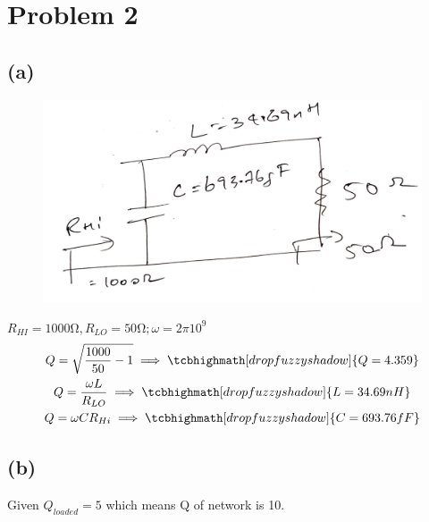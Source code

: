 \documentclass{article}
\begin{document}

\section*{\hfil Problem 2}
\subsection*{(a)}
\begin{figure}[H]
	\includegraphics[scale=0.2]{./figs/q2_a.png}
\end{figure}
$R_{HI} = 1000 \si{\ohm}, R_{LO} = 50 \si{\ohm}; \omega = 2 \pi 10^9$
\begin{gather}
	Q = \sqrt{\frac{1000}{50} - 1} \implies \tcbhighmath[drop fuzzy shadow]{Q = 4.359} \\
	Q = \frac{\omega L}{R_{LO}} \implies \tcbhighmath[drop fuzzy shadow]{L = 34.69 nH} \\
	Q = \omega CR_{Hi} \implies \tcbhighmath[drop fuzzy shadow]{C = 693.76fF}
\end{gather}
\subsection*{(b)}
Given $Q_{loaded} = 5$ which means Q of network is 10. 
\end{document}
